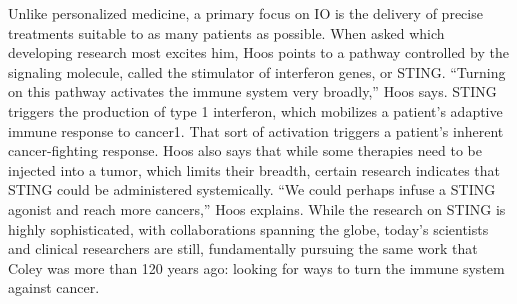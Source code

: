 \documentclass[12pt]{article}
\begin{document}
Unlike personalized medicine, a primary focus on IO is the delivery of precise treatments suitable to as many patients as possible. When asked which developing research most excites him, Hoos points to a pathway controlled by the signaling molecule, called the stimulator of interferon genes, or STING.
“Turning on this pathway activates the immune system very broadly,” Hoos says. STING triggers the production of type 1 interferon, which mobilizes a patient’s adaptive immune response to cancer1. That sort of activation triggers a patient’s inherent cancer-fighting response.
Hoos also says that while some therapies need to be injected into a tumor, which limits their breadth, certain research indicates that STING could be administered systemically. “We could perhaps infuse a STING agonist and reach more cancers,” Hoos explains.
While the research on STING is highly sophisticated, with collaborations spanning the globe, today’s scientists and clinical researchers are still, fundamentally pursuing the same work that Coley was more than 120 years ago: looking for ways to turn the immune system against cancer. 









\enddocument
\end{document}
